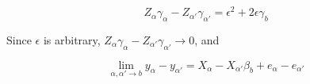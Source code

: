\documentclass{article}
\begin{document}
                                                                                                                                                                       $$Z_{\alpha}\gamma_{\alpha}-Z_{\alpha'}\gamma_{\alpha'} = \epsilon^{2} + 2\epsilon\gamma_{b}$$
                                                                                                                                                                         
                                                                                                                                                                         Since $\epsilon$ is arbitrary, $Z_{\alpha}\gamma_{\alpha}-Z_{\alpha'}\gamma_{\alpha'} \to 0$, and
                                                                                                                                                                       
                                                                                                                                                                       $$\lim_{\alpha, \alpha' \to b} y_{\alpha}-y_{\alpha'} = X_{\alpha}-X_{\alpha'}\beta_{b}+e_{\alpha}-e_{\alpha'} $$
                                                                                                                                                                       
                                                                                                                                                                        
\end{document}
